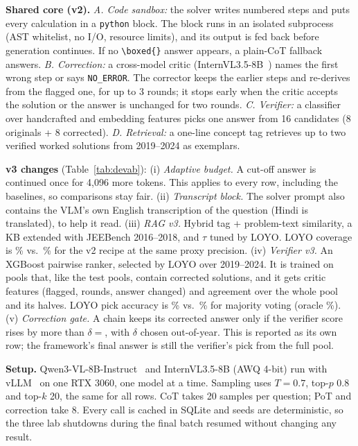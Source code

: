 \documentclass[conference]{IEEEtran}
\begin{document}
\textbf{Shared core (v2).} \emph{A. Code sandbox:} the solver writes numbered steps and puts every
calculation in a \texttt{python} block. The block runs in an isolated subprocess (AST whitelist,
no I/O, resource limits), and its output is fed back before generation continues. If no
\verb|\boxed{}| answer appears, a plain-CoT fallback answers.
\emph{B. Correction:} a cross-model critic (InternVL3.5-8B~\cite{internvl35}) names the first
wrong step or says \texttt{NO\_ERROR}. The corrector keeps the earlier steps and re-derives from
the flagged one, for up to 3 rounds; it stops early when the critic accepts the solution or the
answer is unchanged for two rounds.
\emph{C. Verifier:} a classifier over handcrafted and embedding features picks one answer from 16
candidates (8 originals + 8 corrected).
\emph{D. Retrieval:} a one-line concept tag retrieves up to two verified worked solutions from
2019--2024 as exemplars.

\textbf{v3 changes} (Table~\ref{tab:devab}):
(i) \emph{Adaptive budget.} A cut-off answer is continued once for 4{,}096 more tokens. This
applies to every row, including the baselines, so comparisons stay fair.
(ii) \emph{Transcript block.} The solver prompt also contains the VLM's own English
transcription of the question (Hindi is translated), to help it read.
(iii) \emph{RAG v3.} Hybrid tag + problem-text similarity, a KB extended with JEEBench
2016--2018, and $\tau$ tuned by LOYO. LOYO coverage is \RagCovThree\% vs.\ \RagCovTwo\% for the
v2 recipe at the same proxy precision.
(iv) \emph{Verifier v3.} An XGBoost pairwise ranker, selected by LOYO over 2019--2024. It is
trained on pools that, like the test pools, contain corrected solutions, and it gets critic
features (flagged, rounds, answer changed) and agreement over the whole pool and its halves. LOYO
pick accuracy is \VerLoyo\% vs.\ \VerLoyoMaj\% for majority voting (oracle \VerLoyoOracle\%).
(v) \emph{Correction gate.} A chain keeps its corrected answer only if the verifier score rises
by more than $\delta{=}$\GateDelta{}, with $\delta$ chosen out-of-year. This is reported as its
own row; the framework's final answer is still the verifier's pick from the full pool.



\textbf{Setup.} Qwen3-VL-8B-Instruct~\cite{qwen3vl} and InternVL3.5-8B (AWQ 4-bit) run with
vLLM~\cite{vllm} on one RTX 3060, one model at a time. Sampling uses $T{=}0.7$, top-$p$ 0.8 and
top-$k$ 20, the same for all rows. CoT takes 20 samples per question; PoT and correction take 8.
Every call is cached in SQLite and seeds are deterministic, so the three lab shutdowns during the
final batch resumed without changing any result.
\end{document}
